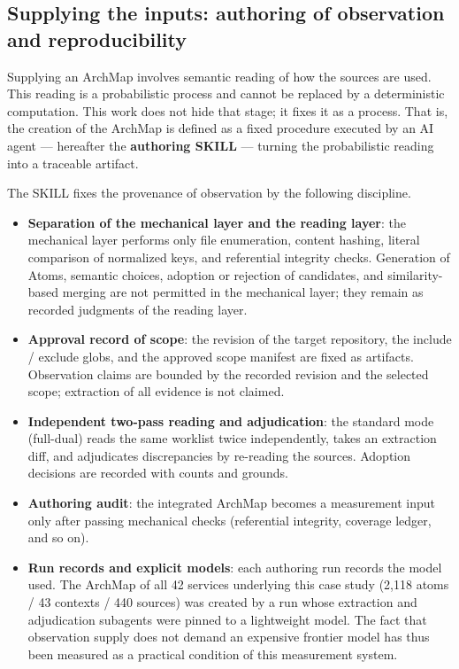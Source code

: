 \subsection{Supplying the inputs: authoring of observation and reproducibility}\label{app:C2}

Supplying an ArchMap involves semantic reading of how the sources are
used. This reading is a probabilistic process and cannot be replaced
by a deterministic computation. This work does not hide that stage; it
fixes it as a process. That is, the creation of the ArchMap is defined
as a fixed procedure executed by an AI agent --- hereafter the
\textbf{authoring SKILL} --- turning the probabilistic reading into a
traceable artifact.

The SKILL fixes the provenance of observation by the following
discipline.
\begin{itemize}
\item \textbf{Separation of the mechanical layer and the reading
layer}: the mechanical layer performs only file enumeration, content
hashing, literal comparison of normalized keys, and referential
integrity checks. Generation of Atoms, semantic choices, adoption or
rejection of candidates, and similarity-based merging are not
permitted in the mechanical layer; they remain as recorded judgments
of the reading layer.
\item \textbf{Approval record of scope}: the revision of the target
repository, the include / exclude globs, and the approved scope
manifest are fixed as artifacts. Observation claims are bounded by the
recorded revision and the selected scope; extraction of all evidence
is not claimed.
\item \textbf{Independent two-pass reading and adjudication}: the
standard mode (full-dual) reads the same worklist twice independently,
takes an extraction diff, and adjudicates discrepancies by re-reading
the sources. Adoption decisions are recorded with counts and grounds.
\item \textbf{Authoring audit}: the integrated ArchMap becomes a
measurement input only after passing mechanical checks (referential
integrity, coverage ledger, and so on).
\item \textbf{Run records and explicit models}: each authoring run
records the model used. The ArchMap of all 42 services underlying this
case study (2{,}118 atoms / 43 contexts / 440 sources) was created by
a run whose extraction and adjudication subagents were pinned to a
lightweight model. The fact that observation supply does not demand an
expensive frontier model has thus been measured as a practical
condition of this measurement system.
\end{itemize}

